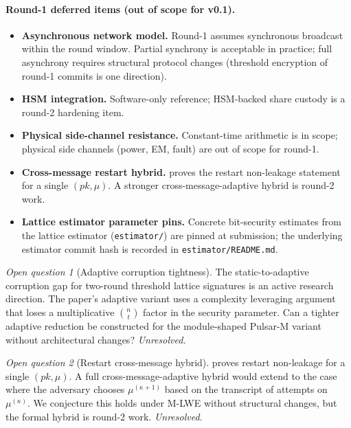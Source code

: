 \documentclass[11pt,a4paper]{article}
\theoremstyle{definition}
\theoremstyle{remark}
\newtheorem{openq}{Open question}
\begin{document}
\paragraph{Round-1 deferred items (out of scope for v0.1).}

\begin{itemize}[leftmargin=*, itemsep=0pt]
\item \textbf{Asynchronous network model.} Round-1 assumes synchronous
broadcast within the round window. Partial synchrony is acceptable
in practice; full asynchrony requires structural protocol changes
(threshold encryption of round-1 commits is one direction).
\item \textbf{HSM integration.} Software-only reference; HSM-backed
share custody is a round-2 hardening item.
\item \textbf{Physical side-channel resistance.} Constant-time
arithmetic is in scope; physical side channels (power, EM, fault) are
out of scope for round-1.
\item \textbf{Cross-message restart hybrid.} 
proves the restart non-leakage statement for a single $(\mathit{pk},
\mu)$. A stronger cross-message-adaptive hybrid is round-2 work.
\item \textbf{Lattice estimator parameter pins.} Concrete bit-security
estimates from the lattice estimator (\texttt{estimator/}) are
pinned at submission; the underlying estimator commit hash is
recorded in \texttt{estimator/README.md}.
\end{itemize}

\begin{openq}[Adaptive corruption tightness]
The static-to-adaptive corruption gap for two-round threshold
lattice signatures is an active research direction. The
\cite{boschini2024corona} paper's adaptive variant uses a complexity
leveraging argument that loses a multiplicative
$\binom{n}{t}$ factor in the security parameter. Can a tighter
adaptive reduction be constructed for the module-shaped
Pulsar-M variant without architectural changes? \emph{Unresolved.}
\end{openq}

\begin{openq}[Restart cross-message hybrid]
 proves restart non-leakage for a single
$(\mathit{pk}, \mu)$. A full cross-message-adaptive hybrid would
extend to the case where the adversary chooses $\mu^{(\kappa+1)}$
based on the transcript of attempts on $\mu^{(\kappa)}$. We
conjecture this holds under M-LWE without structural changes, but
the formal hybrid is round-2 work. \emph{Unresolved.}
\end{openq}
\end{document}
